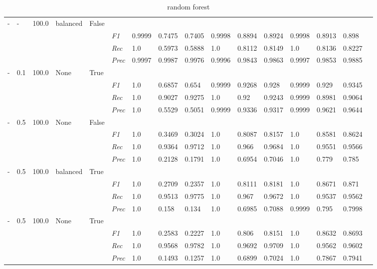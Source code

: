 \begin{table}[]
\begin{tabularx}{\textwidth}{XXXXX|X|XXX|XXX|XXXX}
    - & - & 100.0 & balanced & False& & & & & & & & & \\
    & & & & & \textit{F1} & 0.9999 & 0.7475 & 0.7405 & 0.9998 & 0.8894        & 0.8924        & 0.9998        & 0.8913        & 0.898        \\
    & & & & & \textit{Rec} & 1.0 & 0.5973 & 0.5888    & 1.0 & 0.8112    & 0.8149    & 1.0    & 0.8136    & 0.8227    \\
    & & & & & \textit{Prec} & 0.9997 & 0.9987 & 0.9976 & 0.9996 & 0.9843 & 0.9863 & 0.9997 & 0.9853 & 0.9885 \\ \midrule
    - & 0.1 & 100.0 & None & True& & & & & & & & & \\
    & & & & & \textit{F1} & 1.0 & 0.6857 & 0.654 & 0.9999 & 0.9268        & 0.928        & 0.9999        & 0.929        & 0.9345        \\
    & & & & & \textit{Rec} & 1.0 & 0.9027 & 0.9275    & 1.0 & 0.92    & 0.9243    & 0.9999    & 0.8981    & 0.9064    \\
    & & & & & \textit{Prec} & 1.0 & 0.5529 & 0.5051 & 0.9999 & 0.9336 & 0.9317 & 0.9999 & 0.9621 & 0.9644 \\ \midrule
    - & 0.5 & 100.0 & None & False& & & & & & & & & \\
    & & & & & \textit{F1} & 1.0 & 0.3469 & 0.3024 & 1.0 & 0.8087        & 0.8157        & 1.0        & 0.8581        & 0.8624        \\
    & & & & & \textit{Rec} & 1.0 & 0.9364 & 0.9712    & 1.0 & 0.966    & 0.9684    & 1.0    & 0.9551    & 0.9566    \\
    & & & & & \textit{Prec} & 1.0 & 0.2128 & 0.1791 & 1.0 & 0.6954 & 0.7046 & 1.0 & 0.779 & 0.785 \\ \midrule
    - & 0.5 & 100.0 & balanced & True& & & & & & & & & \\
    & & & & & \textit{F1} & 1.0 & 0.2709 & 0.2357 & 1.0 & 0.8111        & 0.8181        & 1.0        & 0.8671        & 0.871        \\
    & & & & & \textit{Rec} & 1.0 & 0.9513 & 0.9775    & 1.0 & 0.967    & 0.9672    & 1.0    & 0.9537    & 0.9562    \\
    & & & & & \textit{Prec} & 1.0 & 0.158 & 0.134 & 1.0 & 0.6985 & 0.7088 & 0.9999 & 0.795 & 0.7998 \\ \midrule
    - & 0.5 & 100.0 & None & True& & & & & & & & & \\
    & & & & & \textit{F1} & 1.0 & 0.2583 & 0.2227 & 1.0 & 0.806        & 0.8151        & 1.0        & 0.8632        & 0.8693        \\
    & & & & & \textit{Rec} & 1.0 & 0.9568 & 0.9782    & 1.0 & 0.9692    & 0.9709    & 1.0    & 0.9562    & 0.9602    \\
    & & & & & \textit{Prec} & 1.0 & 0.1493 & 0.1257 & 1.0 & 0.6899 & 0.7024 & 1.0 & 0.7867 & 0.7941 \\ \midrule
    \end{tabularx}
    \caption{random forest}
    \label{tab:all_results_random_forest}
    \end{table}
    
